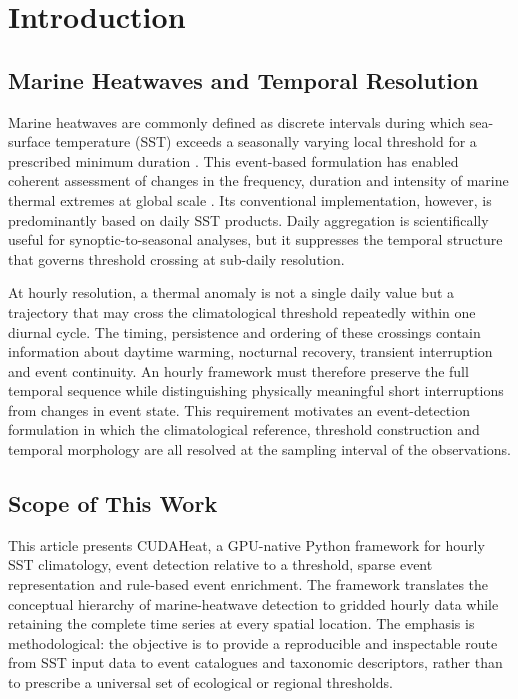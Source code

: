 \section{Introduction}

\subsection{Marine Heatwaves and Temporal Resolution}

Marine heatwaves are commonly defined as discrete intervals during which sea-surface temperature (SST) exceeds a seasonally varying local threshold for a prescribed minimum duration \citep{Hobday2016}. This event-based formulation has enabled coherent assessment of changes in the frequency, duration and intensity of marine thermal extremes at global scale \citep{Oliver2018}. Its conventional implementation, however, is predominantly based on daily SST products. Daily aggregation is scientifically useful for synoptic-to-seasonal analyses, but it suppresses the temporal structure that governs threshold crossing at sub-daily resolution.

At hourly resolution, a thermal anomaly is not a single daily value but a trajectory that may cross the climatological threshold repeatedly within one diurnal cycle. The timing, persistence and ordering of these crossings contain information about daytime warming, nocturnal recovery, transient interruption and event continuity. An hourly framework must therefore preserve the full temporal sequence while distinguishing physically meaningful short interruptions from changes in event state. This requirement motivates an event-detection formulation in which the climatological reference, threshold construction and temporal morphology are all resolved at the sampling interval of the observations.

\subsection{Scope of This Work}

This article presents CUDAHeat, a GPU-native Python framework for hourly SST climatology, event detection relative to a threshold, sparse event representation and rule-based event enrichment. The framework translates the conceptual hierarchy of marine-heatwave detection to gridded hourly data while retaining the complete time series at every spatial location. The emphasis is methodological: the objective is to provide a reproducible and inspectable route from SST input data to event catalogues and taxonomic descriptors, rather than to prescribe a universal set of ecological or regional thresholds.


